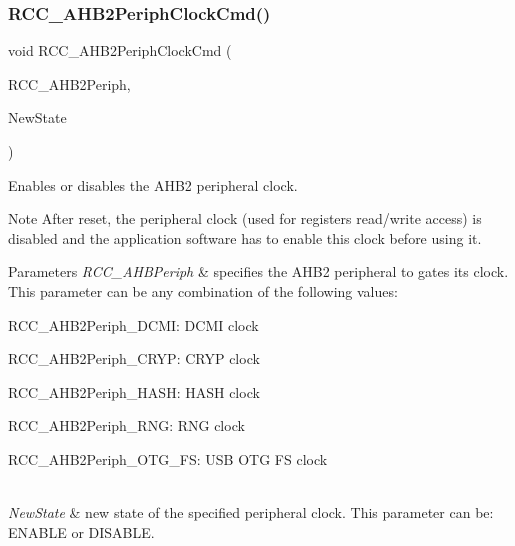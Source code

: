 \mbox{\label{group___r_c_c___group3_gaadffedbd87e796f01d9776b8ee01ff5e}} 
\subsubsection{\texorpdfstring{R\+C\+C\+\_\+\+A\+H\+B2\+Periph\+Clock\+Cmd()}{RCC\_AHB2PeriphClockCmd()}}
{\footnotesize\ttfamily void R\+C\+C\+\_\+\+A\+H\+B2\+Periph\+Clock\+Cmd (\begin{DoxyParamCaption}\item[{uint32\+\_\+t}]{R\+C\+C\+\_\+\+A\+H\+B2\+Periph,  }\item[{Functional\+State}]{New\+State }\end{DoxyParamCaption})}



Enables or disables the A\+H\+B2 peripheral clock. 

\begin{DoxyNote}{Note}
After reset, the peripheral clock (used for registers read/write access) is disabled and the application software has to enable this clock before using it. 
\end{DoxyNote}

\begin{DoxyParams}{Parameters}
{\em R\+C\+C\+\_\+\+A\+H\+B\+Periph} & specifies the A\+H\+B2 peripheral to gates its clock. This parameter can be any combination of the following values\+: \begin{DoxyItemize}
\item R\+C\+C\+\_\+\+A\+H\+B2\+Periph\+\_\+\+D\+C\+MI\+: D\+C\+MI clock \item R\+C\+C\+\_\+\+A\+H\+B2\+Periph\+\_\+\+C\+R\+YP\+: C\+R\+YP clock \item R\+C\+C\+\_\+\+A\+H\+B2\+Periph\+\_\+\+H\+A\+SH\+: H\+A\+SH clock \item R\+C\+C\+\_\+\+A\+H\+B2\+Periph\+\_\+\+R\+NG\+: R\+NG clock \item R\+C\+C\+\_\+\+A\+H\+B2\+Periph\+\_\+\+O\+T\+G\+\_\+\+FS\+: U\+SB O\+TG FS clock \end{DoxyItemize}
\\
\hline
{\em New\+State} & new state of the specified peripheral clock. This parameter can be\+: E\+N\+A\+B\+LE or D\+I\+S\+A\+B\+LE. \\
\hline
\end{DoxyParams}

